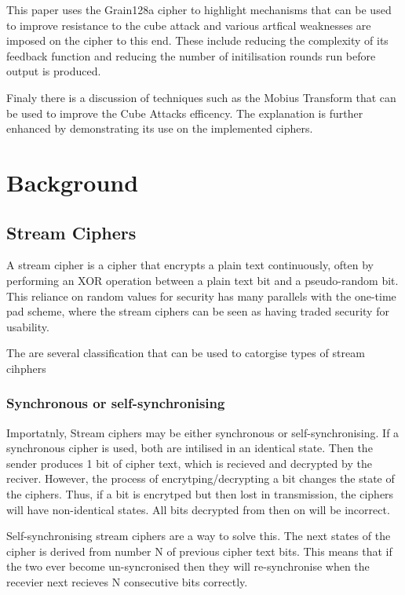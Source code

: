 \documentclass{report}
\begin{document}
This paper uses the Grain128a cipher to highlight mechanisms that can be used to improve resistance to the cube attack and various artfical weaknesses are imposed on the cipher to this end. These include reducing the complexity of its feedback function and reducing the number of initilisation rounds run before output is produced.

Finaly there is a discussion of techniques such as the Mobius Transform that can be used to improve the Cube Attacks efficency. The explanation is further enhanced by demonstrating its use on the implemented ciphers.

\chapter{Background}
\section{Stream Ciphers}
A stream cipher is a cipher that encrypts a plain text continuously, often by performing an XOR operation between a plain text bit and a pseudo-random bit. This reliance on random values for security has many parallels with the one-time pad scheme, where the stream ciphers can be seen as having traded security for usability.

The are several classification that can be used to catorgise types of stream cihphers

\subsection{Synchronous or self-synchronising}
Importatnly, Stream ciphers may be either synchronous or self-synchronising. If a synchronous cipher is used, both are intilised in an identical state. Then the sender produces 1 bit of cipher text, which is recieved and decrypted by the reciver. However, the process of encrytping/decrypting a bit changes the state of the ciphers. Thus, if a bit is encrytped but then lost in transmission, the ciphers will have non-identical states. All bits decrypted from then on will be incorrect.

Self-synchronising stream ciphers are a way to solve this. The next states of the cipher is derived from number N of previous cipher text bits. This means that if the two ever become un-syncronised then they will re-synchronise when the recevier next recieves N consecutive bits correctly.

\end{document}
